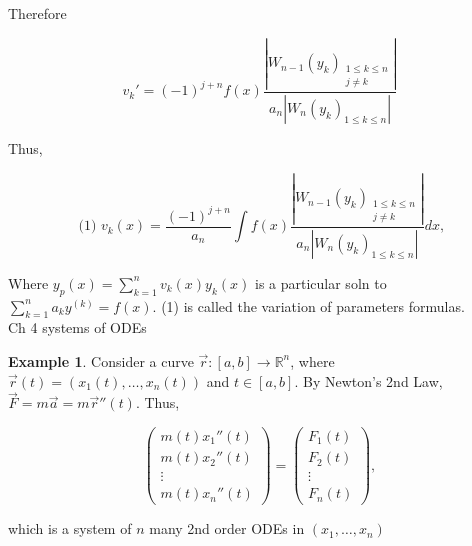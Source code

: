 \documentclass[12pt,a4paper]{article}
\theoremstyle{definition}
\newtheorem*{example}{Example}
\begin{document}
Therefore 

\[ v_k' = (-1)^{j+n}f(x) \frac{|W_{n-1}(y_k)_{\substack{1 \leq k \leq n
\\
j \neq k}}|}{a_n|W_n(y_k)_{1 \leq k \leq n}|}  \]

Thus, 

\[ \text{ (1) } v_k(x) = 
\frac{(-1)^{j+n}}{a_n} \int f(x) \frac{|W_{n-1}(y_k)_{\substack{1 \leq
k \leq n \\
j \neq k}}|}{a_n|W_n(y_k)_{1 \leq k \leq n}|}  dx,
\]

Where \( y_p(x) = \sum_{k=1}^{n}v_k(x)y_k(x) \) is a particular soln to
\( \sum_{k=1}^{n}a_ky^{(k)} = f(x) \). (1) is called the variation of
parameters formulas. \\[5mm]

Ch 4 systems of ODEs 

\begin{example}
  Consider a curve \( \vec{r}:[a,b] \to \mathbb{R}^n \), where \(
  \vec{r}(t) = (x_1(t), \dots , x_n(t)) \) and \( t \in [a,b] \). By
  Newton's 2nd Law, \( \vec{F} = m\vec{a} = m\vec{r}''(t)\). Thus, 

  \[ 
  \begin{pmatrix}
    m(t)x_1''(t) \\
    m(t)x_2''(t) \\
    \vdots \\
    m(t)x_n''(t) 
  \end{pmatrix}
  =
  \begin{pmatrix}
    F_1(t) \\
    F_2(t) \\
    \vdots \\
    F_n(t) 
  \end{pmatrix}
  ,
  \]

  which is a system of \( n \) many 2nd order ODEs in \( (x_1, \dots ,
  x_n) \)


\end{example}





\end{document}
